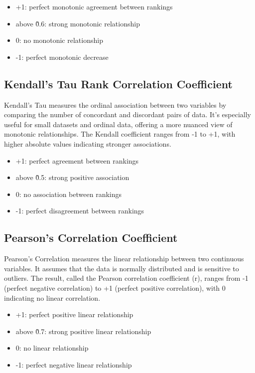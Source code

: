 \begin{itemize}
    \item +1: perfect monotonic agreement between rankings
    \item above \~ 0.6: strong monotonic relationship
    \item 0: no monotonic relationship
    \item -1: perfect monotonic decrease
\end{itemize}

\subsection{Kendall's Tau Rank Correlation Coefficient}\label{kendalls-tau-rank-correlation-coefficient}

Kendall's Tau measures the ordinal association between two variables by comparing the number of concordant and discordant pairs of data. It's especially useful for small datasets and ordinal data, offering a more nuanced view of monotonic relationships. The Kendall coefficient ranges from -1 to +1, with higher absolute values indicating stronger associations.

\begin{itemize}
    \item +1: perfect agreement between rankings
    \item above \~ 0.5: strong positive association
    \item 0: no association between rankings
    \item -1: perfect disagreement between rankings
\end{itemize}

\subsection{Pearson's Correlation Coefficient}\label{pearsons-correlation-coefficient}

Pearson's Correlation measures the linear relationship between two continuous variables. It assumes that the data is normally distributed and is sensitive to outliers. The result, called the Pearson correlation coefficient (r), ranges from -1 (perfect negative correlation) to +1 (perfect positive correlation), with 0 indicating no linear correlation.

\begin{itemize}
    \item +1: perfect positive linear relationship
    \item above \~ 0.7: strong positive linear relationship
    \item 0: no linear relationship
    \item -1: perfect negative linear relationship
\end{itemize}

